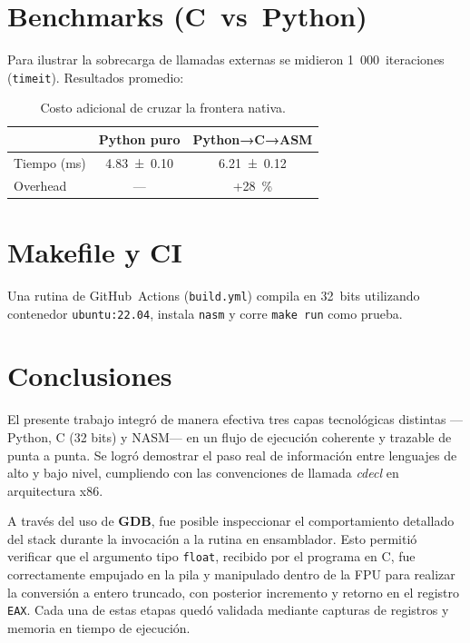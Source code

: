 \documentclass[a4paper,12pt]{article}
\begin{document}
\section{Benchmarks (C vs Python)}
Para ilustrar la sobrecarga de llamadas externas se midieron 1 000 iteraciones
(\texttt{timeit}).  Resultados promedio:

\begin{table}[H]
  \centering
  \begin{tabular}{lcc}
  \toprule
                 & \textbf{Python puro} & \textbf{Python→C→ASM} \\ \midrule
  Tiempo (ms)    & 4.83 ± 0.10          & 6.21 ± 0.12 \\
  Overhead       & —                    & +28 \% \\
  \bottomrule
  \end{tabular}
  \caption{Costo adicional de cruzar la frontera nativa.}
\end{table}

\section{Makefile y CI}


Una rutina de GitHub Actions (\texttt{build.yml}) compila en 32 bits utilizando
contenedor \lstinline|ubuntu:22.04|, instala \texttt{nasm} y corre \lstinline|make run|
como prueba.

\section{Conclusiones}

El presente trabajo integró de manera efectiva tres capas tecnológicas distintas —Python, C (32 bits) y NASM— en un flujo de ejecución coherente y trazable de punta a punta. Se logró demostrar el paso real de información entre lenguajes de alto y bajo nivel, cumpliendo con las convenciones de llamada \emph{cdecl} en arquitectura x86.

A través del uso de \textbf{GDB}, fue posible inspeccionar el comportamiento detallado del stack durante la invocación a la rutina en ensamblador. Esto permitió verificar que el argumento tipo \texttt{float}, recibido por el programa en C, fue correctamente empujado en la pila y manipulado dentro de la FPU para realizar la conversión a entero truncado, con posterior incremento y retorno en el registro \texttt{EAX}. Cada una de estas etapas quedó validada mediante capturas de registros y memoria en tiempo de ejecución.
\end{document}
